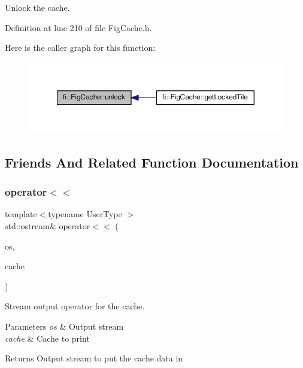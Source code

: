 Unlock the cache. 



Definition at line 210 of file Fig\+Cache.\+h.

Here is the caller graph for this function\+:
\nopagebreak
\begin{figure}[H]
\begin{center}
\leavevmode
\includegraphics[width=350pt]{d7/d31/classfi_1_1FigCache_af463d23f5dbf6f418e14da2e26774e10_icgraph}
\end{center}
\end{figure}


\subsection{Friends And Related Function Documentation}
\mbox{\label{classfi_1_1FigCache_a512d75b86b892a2e9cf48d84b1e55c5c}} 
\subsubsection{\texorpdfstring{operator$<$$<$}{operator<<}}
{\footnotesize\ttfamily template$<$typename User\+Type $>$ \\
std\+::ostream\& operator$<$$<$ (\begin{DoxyParamCaption}\item[{std\+::ostream \&}]{os,  }\item[{const \hyperlink{classfi_1_1FigCache}{Fig\+Cache}$<$ User\+Type $>$ \&}]{cache }\end{DoxyParamCaption})\hspace{0.3cm}{\ttfamily [friend]}}



Stream output operator for the cache. 


\begin{DoxyParams}{Parameters}
{\em os} & Output stream \\
\hline
{\em cache} & Cache to print \\
\hline
\end{DoxyParams}
\begin{DoxyReturn}{Returns}
Output stream to put the cache data in 
\end{DoxyReturn}


